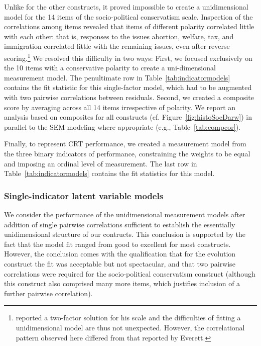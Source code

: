 \documentclass[fignum,man]{apa}\usepackage[]{graphicx}\usepackage[]{color}
\begin{document}
Unlike for the other constructs, it proved impossible to create a unidimensional 
model for the 14 items of the socio-political conservatism scale.
Inspection of the correlations among
items revealed that items of different polarity correlated little with each
other: that is, responses to the issues abortion, welfare, tax, and immigration
correlated little with the remaining issues, even after reverse 
scoring.\footnote{ \cite{Everett13} reported a two-factor solution for his 
	scale and the difficulties of fitting a unidimensional model
	are thus not unexpected. However,
	the correlational pattern observed here differed from that reported by Everett.}  
We resolved this difficulty in two ways: First, we focused
exclusively on the 10 items
with a conservative polarity to create 
a uni-dimensional measurement model.
The penultimate row in Table~\ref{tab:indicatormodels} contains the
fit statistic for this single-factor model, which 
had to be augmented with two pairwise correlations between residuals.
Second, 
  we created a composite score by averaging across all 
  14 items irrespective of polarity. 
  We report an analysis based on composites for all constructs (cf. Figure~\ref{fig:histoSocDarw}) 
  in parallel to the SEM modeling where appropriate (e.g., Table~\ref{tab:compcor}).
  
Finally, to represent CRT performance, we created 
a measurement model from the three  
binary indicators of performance, 
constraining the weights to be equal and
imposing an ordinal level of measurement. 
The last row in Table~\ref{tab:indicatormodels} contains the
fit statistics for this model. 

\subsubsection{Single-indicator latent variable models}
We consider the performance of the unidimensional measurement models 
after addition of single pairwise
correlations sufficient to establish the essentially 
unidimensional structure
of our contructs. This conclusion is supported by the
fact that the model fit ranged from good to excellent \cite{Hooper08}
for most constructs. However, the conclusion 
 comes with the qualification that for the evolution
construct the fit was acceptable but not spectacular, and that two pairwise
correlations were required for the socio-political conservatism construct (although this construct
also comprised many more items, which justifies inclusion of a further pairwise correlation). 
\end{document}
